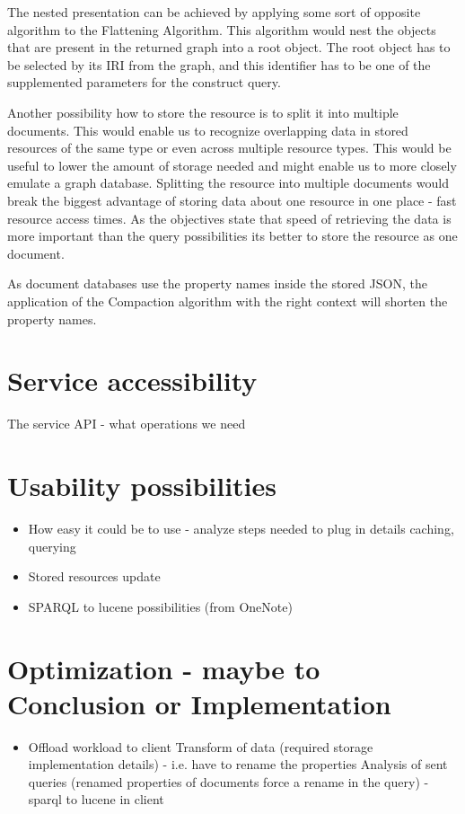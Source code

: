 The nested presentation can be achieved by applying some sort of opposite algorithm to the Flattening Algorithm. This algorithm would nest the objects that are present in the returned graph into a root object. The root object has to be selected by its IRI from the graph, and this identifier has to be one of the supplemented parameters for the construct query.

Another possibility how to store the resource is to split it into multiple documents. This would enable us to recognize overlapping data in stored resources of the same type or even across multiple resource types. This would be useful to lower the amount of storage needed and might enable us to more closely emulate a graph database. Splitting the resource into multiple documents would break the biggest advantage of storing data about one resource in one place - fast resource access times. As the objectives state that speed of retrieving the data is more important than the query possibilities its better to store the resource as one document.

As document databases use the property names inside the stored JSON, the application of the Compaction algorithm with the right context will shorten the property names.

\section{Service accessibility}
The service API - what operations we need

\section{Usability possibilities}
\begin{itemize}
	\item How easy it could be to use - analyze steps needed to plug in details caching, querying
	\item Stored resources update
	\item SPARQL to lucene possibilities (from OneNote)
\end{itemize}


\section{Optimization - maybe to Conclusion or Implementation}
\begin{itemize}
	\item Offload workload to client
		\subitem Transform of data (required storage implementation details) - i.e. have to rename the properties
		\subitem Analysis of sent queries (renamed properties of documents force a rename in the query) - sparql to lucene in client
\end{itemize}
